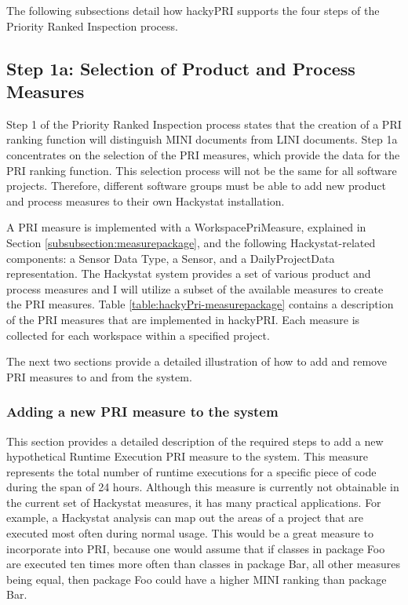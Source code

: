 The following subsections detail how hackyPRI supports the four steps of
the Priority Ranked Inspection process. 

\subsection{Step 1a: Selection of Product and Process Measures}
\label{subsection:step1a}
Step 1 of the Priority Ranked Inspection process states that the creation
of a PRI ranking function will distinguish MINI documents from LINI
documents. Step 1a concentrates on the selection of the PRI measures, which
provide the data for the PRI ranking function. This selection process will
not be the same for all software projects.  Therefore, different software
groups must be able to add new product and process measures to their own
Hackystat installation.

A PRI measure is implemented with a WorkspacePriMeasure, explained in
Section \ref{subsubsection:measurepackage}, and the following
Hackystat-related components: a Sensor Data Type, a Sensor, and a
DailyProjectData representation. The Hackystat system provides a set of
various product and process measures and I will utilize a subset of the
available measures to create the PRI measures. Table
\ref{table:hackyPri-measurepackage} contains a description of the PRI
measures that are implemented in hackyPRI. Each measure is collected for
each workspace within a specified project.

The next two sections provide a detailed illustration of how to add and
remove PRI measures to and from the system.


\subsubsection{Adding a new PRI measure to the system}
\label{subsubsection:addPriMeasure}
This section provides a detailed description of the required steps to add a
new hypothetical Runtime Execution PRI measure to the system. This measure
represents the total number of runtime executions for a specific piece of
code during the span of 24 hours. Although this measure is currently not
obtainable in the current set of Hackystat measures, it has many practical
applications. For example, a Hackystat analysis can map out the areas of a
project that are executed most often during normal usage. This would be a
great measure to incorporate into PRI, because one would assume that if
classes in package Foo are executed ten times more often than classes in
package Bar, all other measures being equal, then package Foo could have a
higher MINI ranking than package Bar.

